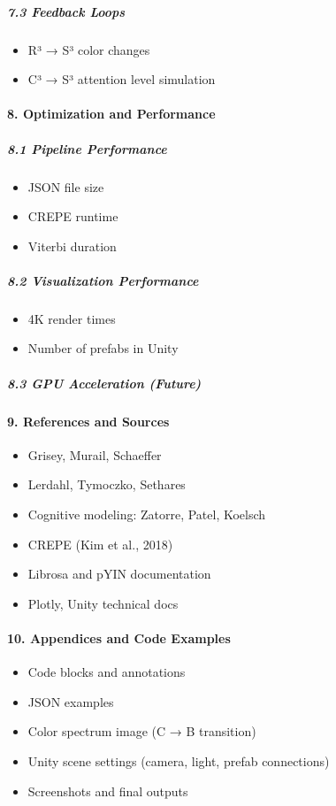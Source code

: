 \subparagraph{7.3 Feedback Loops}
\begin{itemize}
    \item R³ → S³ color changes
    \item C³ → S³ attention level simulation
\end{itemize}

\paragraph{8. Optimization and Performance}

\subparagraph{8.1 Pipeline Performance}
\begin{itemize}
    \item JSON file size
    \item CREPE runtime
    \item Viterbi duration
\end{itemize}

\subparagraph{8.2 Visualization Performance}
\begin{itemize}
    \item 4K render times
    \item Number of prefabs in Unity
\end{itemize}

\subparagraph{8.3 GPU Acceleration (Future)}

\paragraph{9. References and Sources}
\begin{itemize}
    \item Grisey, Murail, Schaeffer
    \item Lerdahl, Tymoczko, Sethares
    \item Cognitive modeling: Zatorre, Patel, Koelsch
    \item CREPE (Kim et al., 2018)
    \item Librosa and pYIN documentation
    \item Plotly, Unity technical docs
\end{itemize}

\paragraph{10. Appendices and Code Examples}
\begin{itemize}
    \item Code blocks and annotations
    \item JSON examples
    \item Color spectrum image (C → B transition)
    \item Unity scene settings (camera, light, prefab connections)
    \item Screenshots and final outputs
\end{itemize}

